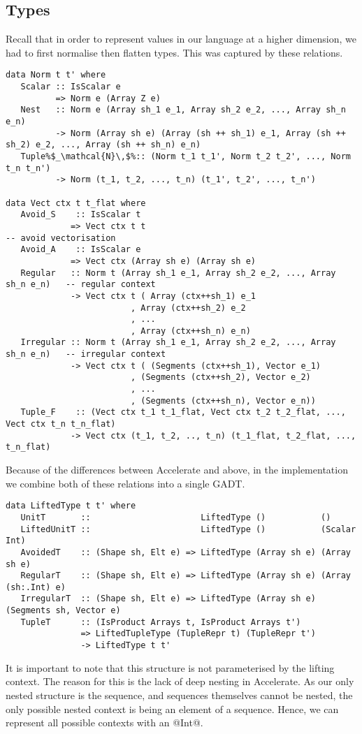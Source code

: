 \subsection{Types}
Recall that in order to represent values in our language at a higher dimension, we had to first normalise then flatten types. This was captured by these relations.
%
\begin{lstlisting}[style=ndp]
data Norm t t' where
   Scalar :: IsScalar e
          => Norm e (Array Z e)
   Nest   :: Norm e (Array sh_1 e_1, Array sh_2 e_2, ..., Array sh_n e_n)
          -> Norm (Array sh e) (Array (sh ++ sh_1) e_1, Array (sh ++ sh_2) e_2, ..., Array (sh ++ sh_n) e_n)
   Tuple%$_\mathcal{N}\,$%:: (Norm t_1 t_1', Norm t_2 t_2', ..., Norm t_n t_n')
          -> Norm (t_1, t_2, ..., t_n) (t_1', t_2', ..., t_n')

data Vect ctx t t_flat where
   Avoid_S    :: IsScalar t
             => Vect ctx t t                                             -- avoid vectorisation
   Avoid_A    :: IsScalar e
             => Vect ctx (Array sh e) (Array sh e)
   Regular   :: Norm t (Array sh_1 e_1, Array sh_2 e_2, ..., Array sh_n e_n)   -- regular context
             -> Vect ctx t ( Array (ctx++sh_1) e_1
                         , Array (ctx++sh_2) e_2
                         , ...
                         , Array (ctx++sh_n) e_n)
   Irregular :: Norm t (Array sh_1 e_1, Array sh_2 e_2, ..., Array sh_n e_n)   -- irregular context
             -> Vect ctx t ( (Segments (ctx++sh_1), Vector e_1)
                         , (Segments (ctx++sh_2), Vector e_2)
                         , ...
                         , (Segments (ctx++sh_n), Vector e_n))
   Tuple_F    :: (Vect ctx t_1 t_1_flat, Vect ctx t_2 t_2_flat, ..., Vect ctx t_n t_n_flat)
             -> Vect ctx (t_1, t_2, .., t_n) (t_1_flat, t_2_flat, ..., t_n_flat)
\end{lstlisting}
%
Because of the differences between Accelerate and \ndp above, in the implementation we combine both of these relations into a single GADT.
%
\begin{lstlisting}
data LiftedType t t' where
   UnitT       ::                      LiftedType ()           ()
   LiftedUnitT ::                      LiftedType ()           (Scalar Int)
   AvoidedT    :: (Shape sh, Elt e) => LiftedType (Array sh e) (Array sh e)
   RegularT    :: (Shape sh, Elt e) => LiftedType (Array sh e) (Array (sh:.Int) e)
   IrregularT  :: (Shape sh, Elt e) => LiftedType (Array sh e) (Segments sh, Vector e)
   TupleT      :: (IsProduct Arrays t, IsProduct Arrays t')
               => LiftedTupleType (TupleRepr t) (TupleRepr t')
               -> LiftedType t t'
\end{lstlisting}
%
It is important to note that this structure is not parameterised by the lifting context. The reason for this is the lack of deep nesting in Accelerate. As our only nested structure is the sequence, and sequences themselves cannot be nested, the only possible nested context is being an element of a sequence. Hence, we can represent all possible contexts with an @Int@.

